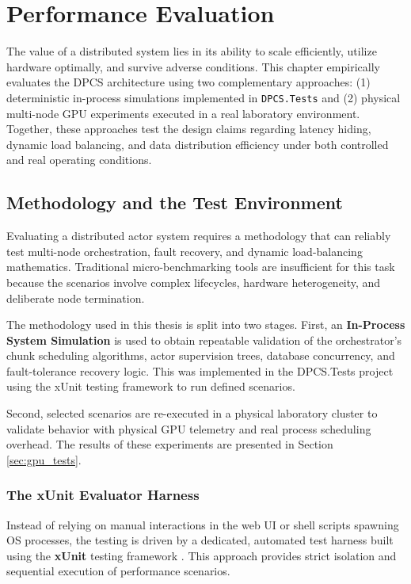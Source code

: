 \chapter{Performance Evaluation}
\label{chap:evaluation}

The value of a distributed system lies in its ability to scale efficiently, utilize hardware optimally, and survive adverse conditions. This chapter empirically evaluates the DPCS architecture using two complementary approaches: (1) deterministic in-process simulations implemented in \verb|DPCS.Tests| and (2) physical multi-node GPU experiments executed in a real laboratory environment. Together, these approaches test the design claims regarding latency hiding, dynamic load balancing, and data distribution efficiency under both controlled and real operating conditions.

\section{Methodology and the Test Environment}

Evaluating a distributed actor system requires a methodology that can reliably test multi-node orchestration, fault recovery, and dynamic load-balancing mathematics. Traditional micro-benchmarking tools are insufficient for this task because the scenarios involve complex lifecycles, hardware heterogeneity, and deliberate node termination.

The methodology used in this thesis is split into two stages. First, an \textbf{In-Process System Simulation} is used to obtain repeatable validation of the orchestrator's chunk scheduling algorithms, actor supervision trees, database concurrency, and fault-tolerance recovery logic. This was implemented in the DPCS.Tests project using the xUnit testing framework to run defined scenarios.

Second, selected scenarios are re-executed in a physical laboratory cluster to validate behavior with physical GPU telemetry and real process scheduling overhead. The results of these experiments are presented in Section \ref{sec:gpu_tests}.

\subsection{The xUnit Evaluator Harness}
Instead of relying on manual interactions in the web UI or shell scripts spawning OS processes, the testing is driven by a dedicated, automated test harness built using the \textbf{xUnit} testing framework \cite{xunit}. This approach provides strict isolation and sequential execution of performance scenarios.

